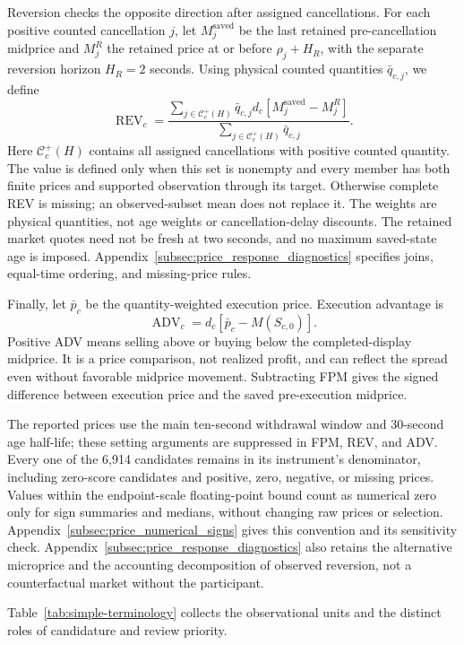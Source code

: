 Reversion checks the opposite direction after assigned cancellations. For each positive counted cancellation $j$, let $M_j^{\mathrm{saved}}$ be the last retained pre-cancellation midprice and $M_j^{R}$ the retained price at or before $\rho_j+H_R$, with the separate reversion horizon $H_R=2$ seconds. Using physical counted quantities $\bar q_{c,j}$, we define
\begin{equation}
    \operatorname{REV}_c=
    \frac{\sum_{j\in\mathcal C_c^+(H)}\bar q_{c,j}d_c
                [M_j^{\mathrm{saved}}-M_j^{R}]}
         {\sum_{j\in\mathcal C_c^+(H)}\bar q_{c,j}}.
    \label{eq:price_reversion}
\end{equation}
Here $\mathcal C_c^+(H)$ contains all assigned cancellations with positive counted quantity. The value is defined only when this set is nonempty and every member has both finite prices and supported observation through its target. Otherwise complete REV is missing; an observed-subset mean does not replace it. The weights are physical quantities, not age weights or cancellation-delay discounts. The retained market quotes need not be fresh at two seconds, and no maximum saved-state age is imposed. Appendix~\ref{subsec:price_response_diagnostics} specifies joins, equal-time ordering, and missing-price rules.

Finally, let $\bar p_c$ be the quantity-weighted execution price. Execution advantage is
\begin{equation}
    \operatorname{ADV}_c=d_c\left[\bar p_c-M(S_{c,0})\right].
    \label{eq:execution_advantage}
\end{equation}
Positive ADV means selling above or buying below the completed-display midprice. It is a price comparison, not realized profit, and can reflect the spread even without favorable midprice movement. Subtracting FPM gives the signed difference between execution price and the saved pre-execution midprice.

The reported prices use the main ten-second withdrawal window and 30-second age half-life; these setting arguments are suppressed in FPM, REV, and ADV. Every one of the 6,914 candidates remains in its instrument's denominator, including zero-score candidates and positive, zero, negative, or missing prices. Values within the endpoint-scale floating-point bound count as numerical zero only for sign summaries and medians, without changing raw prices or selection. Appendix~\ref{subsec:price_numerical_signs} gives this convention and its sensitivity check. Appendix~\ref{subsec:price_response_diagnostics} also retains the alternative microprice and the accounting decomposition of observed reversion, not a counterfactual market without the participant.

Table~\ref{tab:simple-terminology} collects the observational units and the distinct roles of candidature and review priority.

\FloatBarrier
